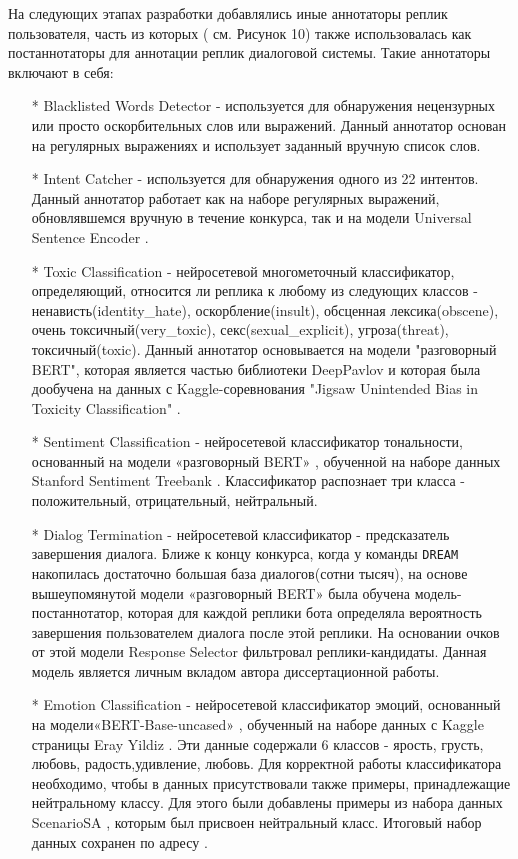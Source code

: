 На следующих этапах разработки добавлялись иные аннотаторы реплик пользователя, часть из которых ( см. Рисунок 10) также использовалась как постаннотаторы для аннотации реплик диалоговой системы. Такие аннотаторы включают в себя:
\begin{itemize}
\item[*] Blacklisted Words Detector - используется для обнаружения нецензурных или просто оскорбительных слов или выражений. Данный аннотатор основан на регулярных выражениях и использует заданный вручную список слов.

\item[*] Intent Catcher - используется для обнаружения одного из 22 интентов. Данный аннотатор работает как на наборе регулярных выражений, обновлявшемся вручную в течение конкурса, так и на модели Universal Sentence Encoder \cite{cer_2018}.

\item[*] Toxic Classification - нейросетевой многометочный классификатор, определяющий, относится ли реплика к любому из следующих классов - ненависть(identity\_hate), оскорбление(insult), обсценная лексика(obscene), очень токсичный(very\_toxic), секс(sexual\_explicit), угроза(threat), токсичный(toxic). Данный аннотатор основывается на модели "разговорный BERT"\cite{dp_conv_bert}, которая является частью библиотеки DeepPavlov и которая была дообучена на данных с Kaggle-соревнования "Jigsaw Unintended Bias in Toxicity Classification" \cite{toxic_kaggle}.

\item[*] Sentiment Classification - нейросетевой классификатор тональности, основанный на модели «разговорный BERT» \cite{na_website_ndn}, обученной на наборе данных Stanford Sentiment Treebank \cite{sst}. Классификатор распознает три класса - положительный, отрицательный, нейтральный.

\item[*] Dialog Termination - нейросетевой классификатор - предсказатель завершения диалога. Ближе к концу конкурса, когда у команды \texttt{DREAM} накопилась достаточно большая база диалогов(сотни тысяч), на основе вышеупомянутой модели «разговорный BERT» была обучена модель-постаннотатор, которая для каждой реплики бота определяла вероятность завершения пользователем диалога после этой реплики. На основании очков от этой модели Response Selector фильтровал реплики-кандидаты. Данная модель является личным вкладом автора диссертационной работы.

\item[*] Emotion Classification -  нейросетевой классификатор эмоций, основанный на модели«BERT-Base-uncased» , обученный на наборе данных с Kaggle страницы Eray Yildiz \cite{na_website_ndp_emo}. Эти данные содержали 6 классов - ярость, грусть, любовь, радость,удивление, любовь. Для корректной работы классификатора необходимо, чтобы в данных присутствовали также примеры, принадлежащие нейтральному классу. Для этого были добавлены примеры из набора данных ScenarioSA \cite{scenariosa}, которым был присвоен нейтральный класс. Итоговый набор данных сохранен по адресу \cite{na_website_ndo_emo}.
\end{itemize}
